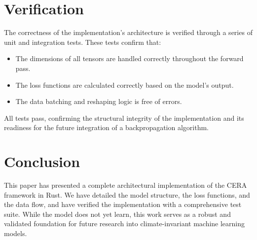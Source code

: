 \documentclass{article}
\begin{document}
\section{Verification}
The correctness of the implementation's architecture is verified through a series of unit and integration tests. These tests confirm that:
\begin{itemize}
    \item The dimensions of all tensors are handled correctly throughout the forward pass.
    \item The loss functions are calculated correctly based on the model's output.
    \item The data batching and reshaping logic is free of errors.
\end{itemize}
All tests pass, confirming the structural integrity of the implementation and its readiness for the future integration of a backpropagation algorithm.

\section{Conclusion}
This paper has presented a complete architectural implementation of the CERA framework in Rust. We have detailed the model structure, the loss functions, and the data flow, and have verified the implementation with a comprehensive test suite. While the model does not yet learn, this work serves as a robust and validated foundation for future research into climate-invariant machine learning models.



\end{document}
